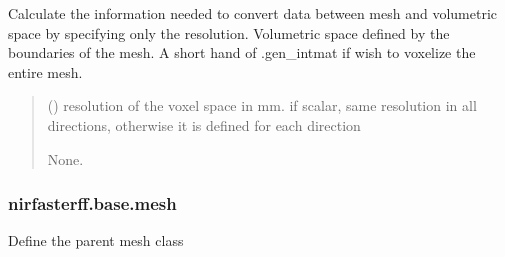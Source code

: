 \documentclass[letterpaper,10pt,english]{sphinxmanual}
\begin{document}
\begin{fulllineitems}
\begin{fulllineitems}
\begin{quote}
\begin{description}
\end{description}\end{quote}

\end{fulllineitems}


\begin{fulllineitems}
\label{\detokenize{_autosummary/nirfasterff.base.fluor_mesh.fluormesh:nirfasterff.base.fluor_mesh.fluormesh.voxelize}}
\pysigstartsignatures
\pysiglinewithargsret
{}
{}
{}
\pysigstopsignatures
\sphinxAtStartPar
Calculate the information needed to convert data between mesh and volumetric space by specifying only the resolution.
Volumetric space defined by the boundaries of the mesh. A short hand of .gen\_intmat if wish to voxelize the entire mesh.
\begin{quote}\begin{description}
\sphinxAtStartPar
{} () \textendash{} resolution of the voxel space in mm.
if scalar, same resolution in all directions, otherwise it is defined for each direction

\sphinxAtStartPar
None.

\end{description}\end{quote}

\end{fulllineitems}


\end{fulllineitems}


\sphinxstepscope


\subsubsection{nirfasterff.base.mesh}
\label{\detokenize{_autosummary/nirfasterff.base.mesh:module-nirfasterff.base.mesh}}\label{\detokenize{_autosummary/nirfasterff.base.mesh:nirfasterff-base-mesh}}\label{\detokenize{_autosummary/nirfasterff.base.mesh::doc}}
\sphinxAtStartPar
Define the parent mesh class
\end{document}
